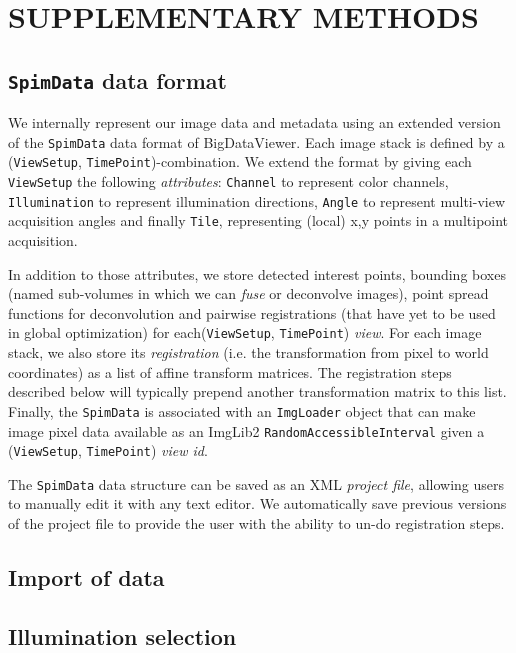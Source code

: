 \section{SUPPLEMENTARY METHODS}
\label{sec:sup-methods}

\subsection{\texttt{SpimData} data format}

We internally represent our image data and metadata using an extended version of the \texttt{SpimData} data format of BigDataViewer\cite{pietzsch2015bigdataviewer}. Each image stack is defined by a (\texttt{ViewSetup}, \texttt{TimePoint})-combination. We extend the format by giving each \texttt{ViewSetup} the following \emph{attributes}: \texttt{Channel} to represent color channels, \texttt{Illumination} to represent illumination directions, \texttt{Angle} to represent multi-view acquisition angles and finally \texttt{Tile}, representing (local) x,y points in a multipoint acquisition.

In addition to those attributes, we store detected interest points, bounding boxes (named sub-volumes in which we can \emph{fuse} or deconvolve images), point spread functions for deconvolution and pairwise registrations (that have yet to be used in global optimization) for each(\texttt{ViewSetup}, \texttt{TimePoint}) \emph{view}. For each image stack, we also store its \emph{registration} (i.e. the transformation from pixel to world coordinates) as a list of affine transform matrices. The registration steps described below will typically prepend another transformation matrix to this list. Finally, the \texttt{SpimData} is associated with an \texttt{ImgLoader} object that can make image pixel data available as an ImgLib2 \texttt{RandomAccessibleInterval} given a  (\texttt{ViewSetup}, \texttt{TimePoint}) \emph{view id}.

The \texttt{SpimData} data structure can be saved as an XML \emph{project file}, allowing users to manually edit it with any text editor. We automatically save previous versions of the project file to provide the user with the ability to un-do registration steps.

\subsection{Import of data}

\subsection{Illumination selection}

